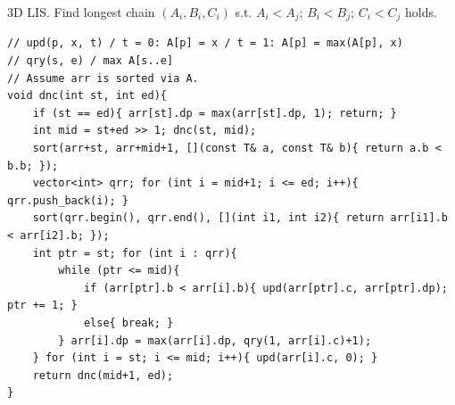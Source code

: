 3D LIS. Find longest chain $(A_i, B_i, C_i)$ s.t. $A_i < A_j$; $B_i < B_j$; $C_i < C_j$ holds.
\begin{verbatim}
// upd(p, x, t) / t = 0: A[p] = x / t = 1: A[p] = max(A[p], x)
// qry(s, e) / max A[s..e]
// Assume arr is sorted via A.
void dnc(int st, int ed){
	if (st == ed){ arr[st].dp = max(arr[st].dp, 1); return; }
	int mid = st+ed >> 1; dnc(st, mid);
	sort(arr+st, arr+mid+1, [](const T& a, const T& b){ return a.b < b.b; });
	vector<int> qrr; for (int i = mid+1; i <= ed; i++){ qrr.push_back(i); }
	sort(qrr.begin(), qrr.end(), [](int i1, int i2){ return arr[i1].b < arr[i2].b; });
	int ptr = st; for (int i : qrr){
		while (ptr <= mid){
			if (arr[ptr].b < arr[i].b){ upd(arr[ptr].c, arr[ptr].dp); ptr += 1; }
			else{ break; }
		} arr[i].dp = max(arr[i].dp, qry(1, arr[i].c)+1);
	} for (int i = st; i <= mid; i++){ upd(arr[i].c, 0); }
	return dnc(mid+1, ed);
}
\end{verbatim}